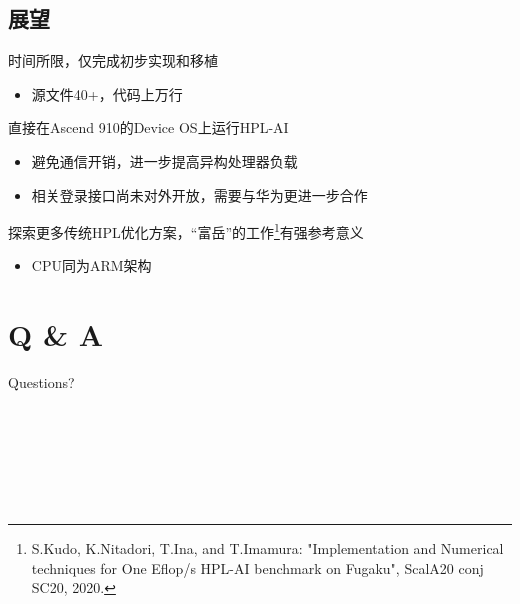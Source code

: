 \documentclass[
    fontset=fandol,
    xcolor=svgnames %
]{ctexbeamer}
\begin{document}
\subsection{展望}
\begin{frame}
    \begin{block}{时间所限，仅完成初步实现和移植}
        \begin{itemize}
            \item 源文件40+，代码上万行
        \end{itemize}
    \end{block}
    \begin{block}{直接在Ascend 910的Device OS上运行HPL-AI}
        \begin{itemize}
            \item 避免通信开销，进一步提高异构处理器负载
            \item 相关登录接口尚未对外开放，需要与华为更进一步合作
        \end{itemize}
    \end{block}

    \begin{block}{探索更多传统HPL优化方案，“富岳”的工作\footnote{S.Kudo, K.Nitadori, T.Ina, and T.Imamura: "Implementation and Numerical techniques for One Eflop/s HPL-AI benchmark on Fugaku", ScalA20 conj SC20, 2020.}有强参考意义}
        \begin{itemize}
            \item CPU同为ARM架构
        \end{itemize}
    \end{block}
\end{frame}

\section{Q \& A}

\begin{frame}

    \begin{block}{Questions?}
        ~\\
        ~\\
        \\
        ~\\
        ~\\
        ~\\
        ~\\
    \end{block}

\end{frame}
\end{document}
